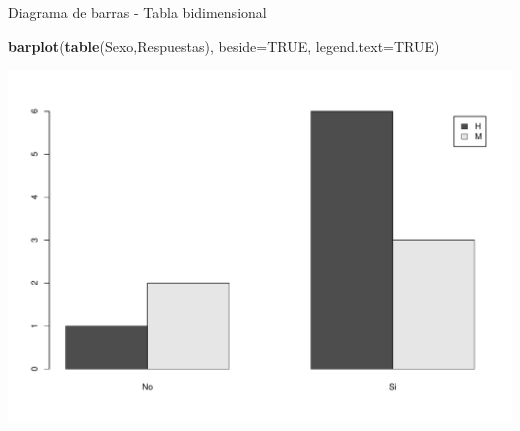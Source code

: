 \documentclass[
  ignorenonframetext,
]{beamer}
\newenvironment{Shaded}{\begin{snugshade}}{\end{snugshade}}
\newcommand{\AttributeTok}[1]{\textcolor[rgb]{0.13,0.29,0.53}{#1}}
\newcommand{\ConstantTok}[1]{\textcolor[rgb]{0.56,0.35,0.01}{#1}}
\newcommand{\FunctionTok}[1]{\textcolor[rgb]{0.13,0.29,0.53}{\textbf{#1}}}
\newcommand{\NormalTok}[1]{#1}
\begin{document}
\begin{frame}[fragile]{Diagrama de barras - Tabla bidimensional}
\label{diagrama-de-barras---tabla-bidimensional-1}
\begin{Shaded}
\begin{Highlighting}[]
\FunctionTok{barplot}\NormalTok{(}\FunctionTok{table}\NormalTok{(Sexo,Respuestas), }\AttributeTok{beside=}\ConstantTok{TRUE}\NormalTok{, }\AttributeTok{legend.text=}\ConstantTok{TRUE}\NormalTok{)}
\end{Highlighting}
\end{Shaded}

\includegraphics{R_base_files/figure-beamer/unnamed-chunk-90-1.pdf}
\end{frame}
\end{document}
